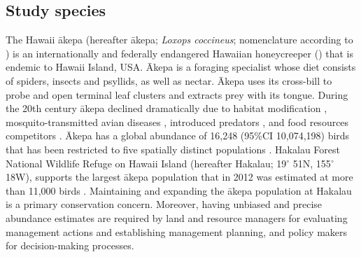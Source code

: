 \documentclass[preprint,12pt]{elsarticle}
\newcommand{\akepa}{\textquotesingle\={a}kepa}  %
\newcommand{\Akepa}{\textquotesingle\={A}kepa}  %
\newcommand{\hawaii}{Hawai\textquotesingle i}   %
\begin{document}
\subsection*{Study species}
The \hawaii{} \akepa{} (hereafter \akepa{}; \textit{Loxops coccineus}; nomenclature according to \citealp{usfws_akepa_1970}) is an internationally and federally endangered Hawaiian honeycreeper (\citealp{usfws_akepa_1970, birdlife_akepa_2016}) that is endemic to \hawaii{} Island, USA. \Akepa{} is a foraging specialist whose diet consists of spiders, insects and psyllids, as well as nectar. \Akepa{} uses its cross-bill to probe and open terminal leaf clusters and extracts prey with its tongue. During the 20th century \akepa{} declined dramatically due to habitat modification \citep{scott_HFBS_1986, pratt_avifaunal_1994},  mosquito-transmitted avian diseases \citep{pratt_avifaunal_1994, atkinson_wildlife_1995}, introduced predators \citep{lepson_akepa_1997}, and food resources competitors \citep{lepson_akepa_1997}. \Akepa{} has a global abundance of 16,248 (95\%CI 10,074,198) birds that has been restricted to five spatially distinct populations \citep{judge_akepa_2018}. Hakalau Forest National Wildlife Refuge on \hawaii{} Island (hereafter Hakalau; 19$^{\circ}$ 51\textquotesingle N, 155$^{\circ}$ 18\textquotesingle W), supports the largest \akepa{} population that in 2012 was estimated at more than 11,000 birds \citep{camp_statespace_2016}. Maintaining and expanding the \akepa{} population at Hakalau is a primary conservation concern. Moreover, having unbiased and precise abundance estimates are required by land and resource managers for evaluating management actions and establishing management planning, and policy makers for decision-making processes.
\end{document}

